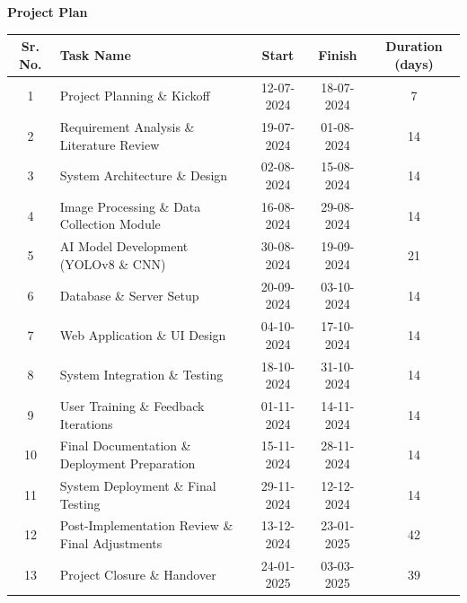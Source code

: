 \documentclass[12pt]{article}
\begin{document}
\begin{center}
    {\Large \textbf{Project Plan }}
\end{center}

\vspace{1em}

\noindent
\begin{tabular}{|c|p{7cm}|c|c|c|}
\hline
\textbf{Sr. No.} & \textbf{Task Name} & \textbf{Start} & \textbf{Finish} & \textbf{Duration (days)} \\
\hline
1  & Project Planning \& Kickoff                             & 12-07-2024 & 18-07-2024 & 7  \\
\hline
2  & Requirement Analysis \& Literature Review               & 19-07-2024 & 01-08-2024 & 14 \\
\hline
3  & System Architecture \& Design                           & 02-08-2024 & 15-08-2024 & 14 \\
\hline
4  & Image Processing \& Data Collection Module              & 16-08-2024 & 29-08-2024 & 14 \\
\hline
5  & AI Model Development (YOLOv8 \& CNN)                      & 30-08-2024 & 19-09-2024 & 21 \\
\hline
6  & Database \& Server Setup                                & 20-09-2024 & 03-10-2024 & 14 \\
\hline
7  & Web Application \& UI Design                            & 04-10-2024 & 17-10-2024 & 14 \\
\hline
8  & System Integration \& Testing                           & 18-10-2024 & 31-10-2024 & 14 \\
\hline
9  & User Training \& Feedback Iterations                    & 01-11-2024 & 14-11-2024 & 14 \\
\hline
10 & Final Documentation \& Deployment Preparation          & 15-11-2024 & 28-11-2024 & 14 \\
\hline
11 & System Deployment \& Final Testing                     & 29-11-2024 & 12-12-2024 & 14 \\
\hline
12 & Post-Implementation Review \& Final Adjustments         & 13-12-2024 & 23-01-2025 & 42 \\
\hline
13 & Project Closure \& Handover                              & 24-01-2025 & 03-03-2025 & 39 \\
\hline
\end{tabular}
\end{document}
